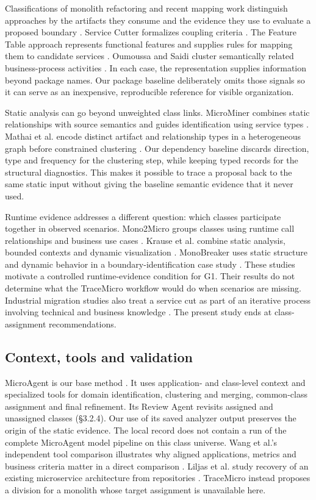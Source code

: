 Classifications of monolith refactoring and recent mapping work distinguish approaches by the artifacts they consume and the evidence they use to evaluate a proposed boundary \cite{classification} \cite{mapping}. Service Cutter formalizes coupling criteria \cite{servicecutter}. The Feature Table approach represents functional features and supplies rules for mapping them to candidate services \cite{features}. Oumoussa and Saidi cluster semantically related business-process activities \cite{bp}. In each case, the representation supplies information beyond package names. Our package baseline deliberately omits those signals so it can serve as an inexpensive, reproducible reference for visible organization.

Static analysis can go beyond unweighted class links. MicroMiner combines static relationships with source semantics and guides identification using service types \cite{microminer}. Mathai et al. encode distinct artifact and relationship types in a heterogeneous graph before constrained clustering \cite{hetgraph}. Our dependency baseline discards direction, type and frequency for the clustering step, while keeping typed records for the structural diagnostics. This makes it possible to trace a proposal back to the same static input without giving the baseline semantic evidence that it never used.

Runtime evidence addresses a different question: which classes participate together in observed scenarios. Mono2Micro groups classes using runtime call relationships and business use cases \cite{kalia2021}. Krause et al. combine static analysis, bounded contexts and dynamic visualization \cite{krause}. MonoBreaker uses static structure and dynamic behavior in a boundary-identification case study \cite{monobreaker}. These studies motivate a controlled runtime-evidence condition for G1. Their results do not determine what the TraceMicro workflow would do when scenarios are missing. Industrial migration studies also treat a service cut as part of an iterative process involving technical and business knowledge \cite{migration}. The present study ends at class-assignment recommendations.

\subsection{Context, tools and validation}

MicroAgent is our base method \cite{su2026}. It uses application- and class-level context and specialized tools for domain identification, clustering and merging, common-class assignment and final refinement. Its Review Agent revisits assigned and unassigned classes (§3.2.4). Our use of its saved analyzer output preserves the origin of the static evidence. The local record does not contain a run of the complete MicroAgent model pipeline on this class universe. Wang et al.'s independent tool comparison illustrates why aligned applications, metrics and business criteria matter in a direct comparison \cite{wang2024}. Liljas et al. study recovery of an existing microservice architecture from repositories \cite{liljas2026}. TraceMicro instead proposes a division for a monolith whose target assignment is unavailable here.

